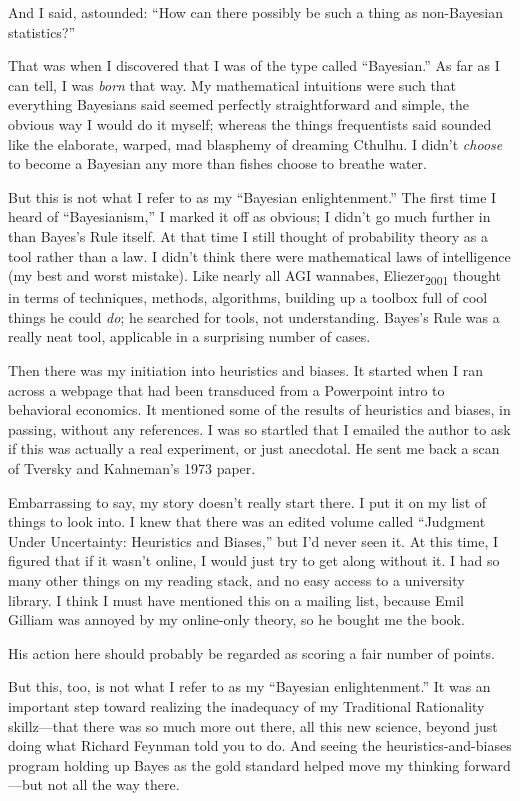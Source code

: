 {
 And I said, astounded: ``How can there possibly
be such a thing as non-Bayesian statistics?''}

{
 That was when I discovered that I was of the type called
``Bayesian.'' As far as I can tell,
I was \textit{born} that way. My mathematical intuitions were such that
everything Bayesians said seemed perfectly straightforward and simple,
the obvious way I would do it myself; whereas the things frequentists
said sounded like the elaborate, warped, mad blasphemy of dreaming
Cthulhu. I didn't \textit{choose} to become a Bayesian
any more than fishes choose to breathe water.}

{
 But this is not what I refer to as my ``Bayesian
enlightenment.'' The first time I heard of
``Bayesianism,'' I marked it off as
obvious; I didn't go much further in than
Bayes's Rule itself. At that time I still thought of
probability theory as a tool rather than a law. I
didn't think there were mathematical laws of
intelligence (my best and worst mistake). Like nearly all AGI wannabes,
Eliezer\textsubscript{2001} thought in terms of techniques, methods,
algorithms, building up a toolbox full of cool things he could
\textit{do}; he searched for tools, not understanding.
Bayes's Rule was a really neat tool, applicable in a
surprising number of cases.}

{
 Then there was my initiation into heuristics and biases. It
started when I ran across a webpage that had been transduced from a
Powerpoint intro to behavioral economics. It mentioned some of the
results of heuristics and biases, in passing, without any references. I
was so startled that I emailed the author to ask if this was actually a
real experiment, or just anecdotal. He sent me back a scan of Tversky
and Kahneman's 1973 paper.}

{
 Embarrassing to say, my story doesn't really start
there. I put it on my list of things to look into. I knew that there
was an edited volume called ``Judgment Under
Uncertainty: Heuristics and Biases,'' but
I'd never seen it. At this time, I figured that if it
wasn't online, I would just try to get along without
it. I had so many other things on my reading stack, and no easy access
to a university library. I think I must have mentioned this on a
mailing list, because Emil Gilliam was annoyed by my online-only
theory, so he bought me the book.}

{
 His action here should probably be regarded as scoring a fair
number of points.}

{
 But this, too, is not what I refer to as my
``Bayesian enlightenment.'' It was
an important step toward realizing the inadequacy of my Traditional
Rationality skillz---that there was so much more out there, all this
new science, beyond just doing what Richard Feynman told you to do. And
seeing the heuristics-and-biases program holding up Bayes as the gold
standard helped move my thinking forward---but not all the way there.}

